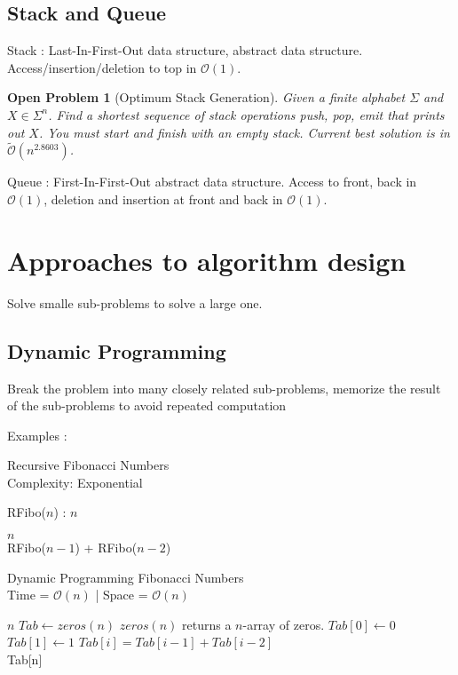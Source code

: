 \documentclass{cours}
\newtheorem{openpb}{Open Problem}
\begin{document}
\subsection{Stack and Queue}
Stack : Last-In-First-Out data structure, abstract data structure. Access/insertion/deletion to top in $\mathcal{O}(1)$.

\begin{openpb}[Optimum Stack Generation]
    Given a finite alphabet $\Sigma$ and $X \in \Sigma^{n}$. Find a shortest sequence of stack operations push, pop, emit that prints out $X$. You must start and finish with an empty stack.
    Current best solution is in $\tilde{\mathcal{O}}(n^{2.8603})$.
\end{openpb}

Queue : First-In-First-Out abstract data structure. Access to front, back in $\mathcal{O}(1)$, deletion and insertion at front and back in $\mathcal{O}(1)$.

\section{Approaches to algorithm design}
Solve smalle sub-problems to solve a large one.

\subsection{Dynamic Programming}
Break the problem into many closely related sub-problems, memorize the result of the sub-problems to avoid repeated computation

Examples :
\begin{algorithm}
    \caption{Recursive Fibonacci Numbers \\ Complexity: Exponential}
    \begin{algorithmic}
        \State RFibo($n$) :
        \Input
        $ n$
        \EndInput

        \Return $n$
        \EndIf\\
        \Return RFibo($n-1$) + RFibo($n-2$)
    \end{algorithmic}
\end{algorithm}

\begin{algorithm}
    \caption{Dynamic Programming Fibonacci Numbers \\ Time = $\mathcal{O}(n)$ | Space = $\mathcal{O}(n)$}
    \begin{algorithmic}
        \Input
        $ n$
        \EndInput
        \State $Tab \gets zeros(n)$ \Comment $zeros(n)$ returns a $n$-array of zeros.
        \State $Tab[0] \gets 0$
        \State $Tab[1] \gets 1$
        \State $Tab[i] = Tab[i-1] + Tab[i-2]$
        \EndFor\\
        \Return Tab[n]
    \end{algorithmic}
\end{algorithm}
\end{document}
